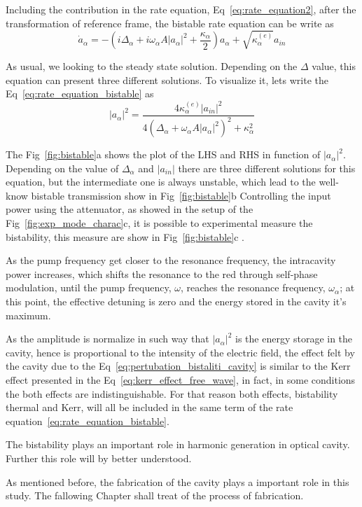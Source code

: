 Including the contribution in the rate equation, Eq~\ref{eq:rate_equation2}, after the transformation of reference frame, the bistable rate equation can be write as 
\begin{equation}
\dot{a}_\alpha = -\left(i\Delta_\alpha + i\omega_\alpha A|a_\alpha|^2 + \frac{\kappa_\alpha}{2}\right)a_\alpha + \sqrt{\kappa^{(e)}_\alpha}a_{in}
\label{eq:rate_equation_bistable}
\end{equation}

As usual, we looking to the steady state solution. Depending on the $\Delta$ value, this equation can present three different solutions. To visualize it, lets write the Eq~\ref{eq:rate_equation_bistable} as 
\begin{equation}
    |a_\alpha|^2 = \frac{4\kappa^{(e)}_\alpha |a_{in}|^2}{4\left(\Delta_\alpha + \omega_\alpha A|a_\alpha|^2\right)^2+\kappa_\alpha^2} 
\end{equation}

The Fig~\ref{fig:bistable}a
shows the plot of the LHS and RHS in function of $|a_\alpha|^2$. Depending on the value of $\Delta_\alpha$ and $|a_{in}|$ there are three different solutions for this equation, but the intermediate one is always unstable, which lead to the well-know bistable transmission show in Fig~\ref{fig:bistable}b
Controlling the input power using the attenuator, as showed in the setup of the Fig~\ref{fig:exp_mode_charac}c, it is possible to experimental measure the bistability, this measure are show in Fig~\ref{fig:bistable}c 
.

As the pump frequency get closer to the resonance frequency, the intracavity power increases, which shifts the resonance to the red through self-phase modulation, until the pump frequency, $\omega$, reaches the resonance frequency, $\omega_\alpha$; at this point, the effective detuning is zero and the energy stored in the cavity it's maximum.  

As the amplitude is normalize in such way that $|a_\alpha|^2$ is the energy storage in the cavity, hence is proportional to the intensity of the electric field, the effect felt by the cavity due to the Eq~\ref{eq:pertubation_bistaliti_cavity} is similar to the Kerr effect presented in the Eq~\ref{eq:kerr_effect_free_wave}, in fact, in some conditions the both effects are indistinguishable\needcit. For that reason both effects, bistability thermal and Kerr, will all be included in the same term of the rate equation~\ref{eq:rate_equation_bistable}.

The bistability plays an important role in harmonic generation in optical cavity. Further this role will by better understood.  

As mentioned before, the fabrication of the cavity plays a important role in this study. The fallowing Chapter shall treat of the process of fabrication. 
